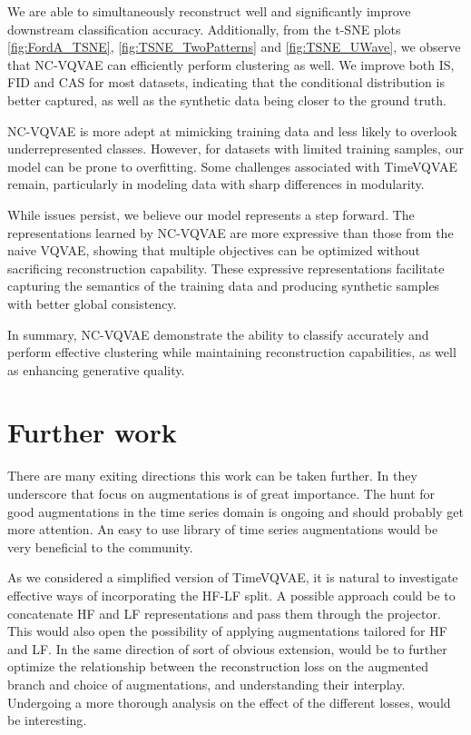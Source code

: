 \documentclass[../../thesis.tex]{subfiles}
\begin{document}
We are able to simultaneously reconstruct well and significantly improve downstream classification accuracy. Additionally, from the t-SNE plots \ref{fig:FordA_TSNE}, \ref{fig:TSNE_TwoPatterns} and \ref{fig:TSNE_UWave}, we observe that NC-VQVAE can efficiently perform clustering as well. We improve both IS, FID and CAS for most datasets, indicating that the conditional distribution is better captured, as well as the synthetic data being closer to the ground truth.\newline

NC-VQVAE is more adept at mimicking training data and less likely to overlook underrepresented classes. However, for datasets with limited training samples, our model can be prone to overfitting. Some challenges associated with TimeVQVAE remain, particularly in modeling data with sharp differences in modularity.\newline

While issues persist, we believe our model represents a step forward. The representations learned by NC-VQVAE are more expressive than those from the naive VQVAE, showing that multiple objectives can be optimized without sacrificing reconstruction capability. These expressive representations facilitate capturing the semantics of the training data and producing synthetic samples with better global consistency.\newline

In summary, NC-VQVAE demonstrate the ability to classify accurately and perform effective clustering while maintaining reconstruction capabilities, as well as enhancing generative quality.

\section{Further work}
There are many exiting directions this work can be taken further. In \cite{morningstar2024augmentations} they underscore that focus on augmentations is of great importance. The hunt for good augmentations in the time series domain is ongoing and should probably get more attention. An easy to use library of time series augmentations would be very beneficial to the community.\newline

As we considered a simplified version of TimeVQVAE, it is natural to investigate effective ways of incorporating the HF-LF split. A possible approach could be to concatenate HF and LF representations and pass them through the projector. This would also open the possibility of applying augmentations tailored for HF and LF. In the same direction of sort of obvious extension, would be to further optimize the relationship between the reconstruction loss on the augmented branch and choice of augmentations, and understanding their interplay. Undergoing a more thorough analysis on the effect of the different losses, would be interesting. \newline
\end{document}
